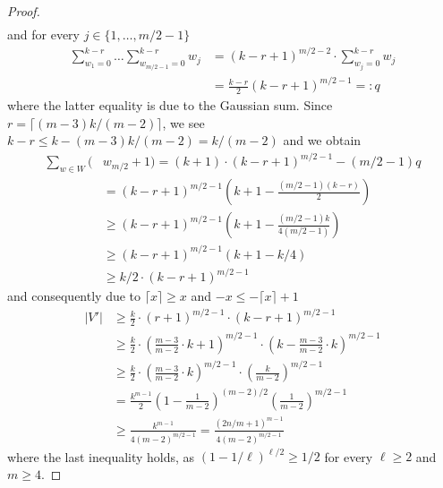 \documentclass[
sigconf = false, %
review = false, %
screen = true, %
anonymous = true, %
format=acmsmall
]{acmart}
\begin{document}
\begin{proof}
\begin{align*}
     \end{align*}
     and for every $j \in \{1,\ldots , m/2-1\}$
     \begin{align*}
     \sum_{w_1=0}^{k-r} \ldots \sum_{w_{m/2-1}=0}^{k-r} w_j &= (k-r+1)^{m/2-2} \cdot \sum_{w_j=0}^{k-r}w_j\\
     &= \frac{k-r}{2}(k-r+1)^{m/2-1} =:q
     \end{align*}
     where the latter equality is due to the Gaussian sum. Since $r=\lceil{(m-3)k/(m-2)}\rceil$, we see $k - r \leq k-(m-3)k/(m-2) = k/(m-2)$
     and we obtain
     \begin{align*}
     \sum_{w \in W}(&w_{m/2}+1) = (k+1) \cdot (k-r+1)^{m/2-1} - (m/2-1)q \\ &= (k-r+1)^{m/2-1}\left(k+1 - \frac{(m/2-1)(k-r)}{2}\right) \\
     &\geq (k-r+1)^{m/2-1} \left(k+1 - \frac{(m/2-1) k}{4(m/2-1)}\right) \\
     &\geq (k-r+1)^{m/2-1}(k+1 - k/4) \\
     &\geq k/2 \cdot (k-r+1)^{m/2-1}
     \end{align*}
     and consequently due to $\lceil{x}\rceil \geq x$ and $-x \leq -\lceil{x}\rceil+1$
     \begin{align*}
     \lvert{V'}\rvert & \geq \frac{k}{2} \cdot (r+1)^{m/2-1} \cdot (k-r+1)^{m/2-1}\\
     &\geq \frac{k}{2} \cdot \left(\frac{m-3}{m-2} \cdot k + 1\right)^{m/2-1} \cdot \left(k-\frac{m-3}{m-2} \cdot k\right)^{m/2-1}\\
     &\geq \frac{k}{2} \cdot \left(\frac{m-3}{m-2} \cdot k\right)^{m/2-1} \cdot \left(\frac{k}{m-2}\right)^{m/2-1}\\
     &= \frac{k^{m-1}}{2} \left(1-\frac{1}{m-2}\right)^{(m-2)/2}\left(\frac{1}{m-2}\right)^{m/2-1}\\
     &\geq \frac{k^{m-1}}{4(m-2)^{m/2-1}} = \frac{(2n/m+1)^{m-1}}{4(m-2)^{m/2-1}}
     \end{align*}
    where the last inequality holds, as $(1-1/\ell)^{\ell/2} \geq 1/2$ for every $\ell \geq 2$ and $m \geq 4$.
\end{proof}
\end{document}
